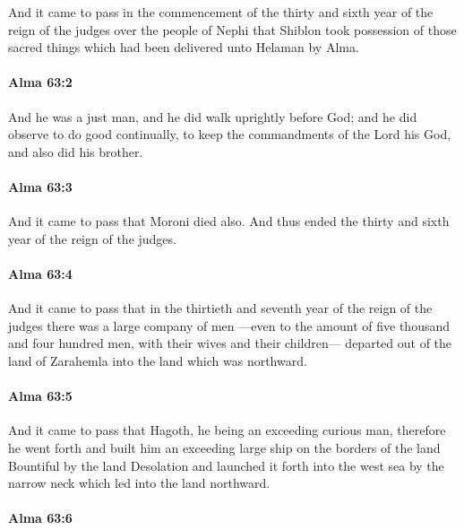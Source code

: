 			And it came to pass in the commencement of the thirty and sixth year
			of the reign of the judges over the people of Nephi
			that Shiblon took possession of those sacred things
			which had been delivered unto Helaman by Alma.

		\paragraph{Alma 63:2} %
			\label{ALMA-63-2}

			And he was a just man,
			and he did walk uprightly before God;
			and he did observe to do good continually,
			to keep the commandments of the Lord his God,
			and also did his brother.

		\paragraph{Alma 63:3} %
			\label{ALMA-63-3}

			And it came to pass that Moroni died also.
			And thus ended the thirty and sixth year of the reign of the judges.

		\paragraph{Alma 63:4} %
			\label{ALMA-63-4}

			And it came to pass that
			in the thirtieth and seventh year of the reign of the judges
			there was a large company of men
			---even to the amount of five thousand and four hundred men,
			with their wives and their children---
			departed out of the land of Zarahemla into the land which was northward.

		\paragraph{Alma 63:5} %
			\label{ALMA-63-5}

			And it came to pass that Hagoth,
			he being an exceeding curious man,
			therefore he went forth and built him an exceeding large ship
			on the borders of the land Bountiful by the land Desolation
			and launched it forth into the west sea
			by the narrow neck which led into the land northward.

		\paragraph{Alma 63:6} %
			\label{ALMA-63-6}

